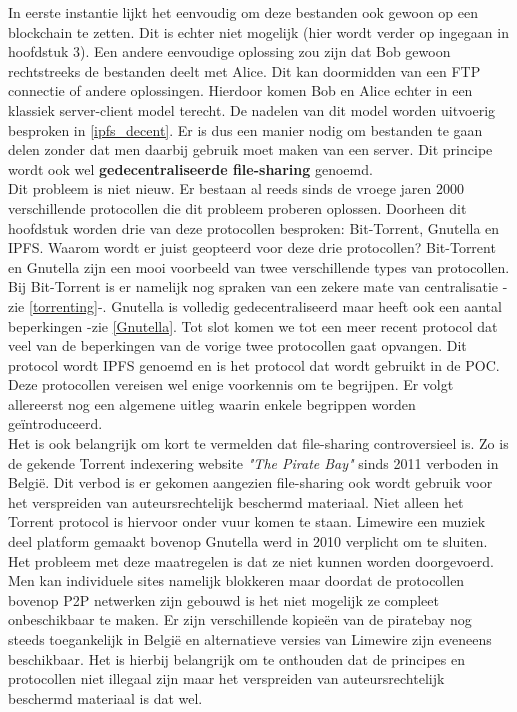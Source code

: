 In eerste instantie lijkt het eenvoudig om deze bestanden ook gewoon op een blockchain te zetten. Dit is echter niet mogelijk (hier wordt verder op ingegaan in hoofdstuk 3). Een andere eenvoudige oplossing zou zijn dat Bob gewoon rechtstreeks de bestanden deelt met Alice. Dit kan doormidden van een FTP connectie of andere oplossingen. Hierdoor komen Bob en Alice echter in een klassiek server-client model terecht. De nadelen van dit model worden uitvoerig besproken in \ref{ipfs_decent}. Er is dus een manier nodig om bestanden te gaan delen zonder dat men daarbij gebruik moet maken van een server. Dit principe wordt ook wel \textbf{gedecentraliseerde file-sharing} genoemd.\\

Dit probleem is niet nieuw. Er bestaan al reeds sinds de vroege jaren 2000 verschillende protocollen die dit probleem proberen oplossen. Doorheen dit hoofdstuk worden drie van deze protocollen besproken: Bit-Torrent, Gnutella en IPFS. Waarom wordt er juist geopteerd voor deze drie protocollen? Bit-Torrent en Gnutella zijn een mooi voorbeeld van twee verschillende types van protocollen. Bij Bit-Torrent is er namelijk nog spraken van een zekere mate van centralisatie -zie \ref{torrenting}-. Gnutella is volledig gedecentraliseerd maar heeft ook een aantal beperkingen -zie \ref{Gnutella}. Tot slot komen we tot een meer recent protocol dat veel van de beperkingen van de vorige twee protocollen gaat opvangen. Dit protocol wordt IPFS genoemd en is het protocol dat wordt gebruikt in de POC. Deze protocollen vereisen wel enige voorkennis om te begrijpen. Er volgt allereerst nog een algemene uitleg waarin enkele begrippen worden geïntroduceerd. \\

Het is ook belangrijk om kort te vermelden dat file-sharing controversieel is. Zo is de gekende Torrent indexering website \textit{"The Pirate Bay"} sinds 2011 verboden in België. Dit verbod is er gekomen aangezien file-sharing ook wordt gebruik voor het verspreiden van auteursrechtelijk beschermd materiaal. Niet alleen het Torrent protocol is hiervoor onder vuur komen te staan. Limewire een muziek deel platform gemaakt bovenop Gnutella werd in 2010 verplicht om te sluiten. Het probleem met deze maatregelen is dat ze niet kunnen worden doorgevoerd. Men kan individuele sites namelijk  blokkeren maar doordat de protocollen bovenop P2P netwerken zijn gebouwd is het niet mogelijk ze compleet onbeschikbaar te maken. Er zijn verschillende kopieën van de piratebay nog steeds toegankelijk in België en alternatieve versies van Limewire zijn eveneens beschikbaar. Het is hierbij belangrijk om te onthouden dat de principes en protocollen niet illegaal zijn maar het verspreiden van auteursrechtelijk beschermd materiaal is dat wel.\\
